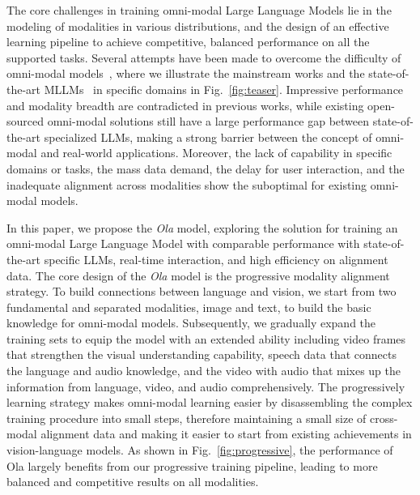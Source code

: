 The core challenges in training omni-modal Large Language Models lie in the modeling of modalities in various distributions, and the design of an effective learning pipeline to achieve competitive, balanced performance on all the supported tasks. Several attempts have been made to overcome the difficulty of omni-modal models~\citep{fu2024vita,fang2024llamaomni,xie2024miniomni2}, where we illustrate the mainstream works and the state-of-the-art MLLMs~\citep{tong2024cambrian,zhang2024videoinstructiontuningsynthetic,li2024llavaov,chu2024qwen2audio} in specific domains in Fig.~\ref{fig:teaser}. Impressive performance and modality breadth are contradicted in previous works, while existing open-sourced omni-modal solutions still have a large performance gap between state-of-the-art specialized LLMs, making a strong barrier between the concept of omni-modal and real-world applications. Moreover, the lack of capability in specific domains or tasks, the mass data demand, the delay for user interaction, and the inadequate alignment across modalities show the suboptimal for existing omni-modal models. 

In this paper, we propose the \textit{Ola} model, exploring the solution for training an omni-modal Large Language Model with comparable performance with state-of-the-art specific LLMs, real-time interaction, and high efficiency on alignment data. The core design of the \textit{Ola} model is the progressive modality alignment strategy. To build connections between language and vision, we start from two fundamental and separated modalities, image and text, to build the basic knowledge for omni-modal models. Subsequently, we gradually expand the training sets to equip the model with an extended ability including video frames that strengthen the visual understanding capability, speech data that connects the language and audio knowledge, and the video with audio that mixes up the information from language, video, and audio comprehensively. The progressively learning strategy makes omni-modal learning easier by disassembling the complex training procedure into small steps, therefore maintaining a small size of cross-modal alignment data and making it easier to start from existing achievements in vision-language models. As shown in Fig.~\ref{fig:progressive}, the performance of Ola largely benefits from our progressive training pipeline, leading to more balanced and competitive results on all modalities.

